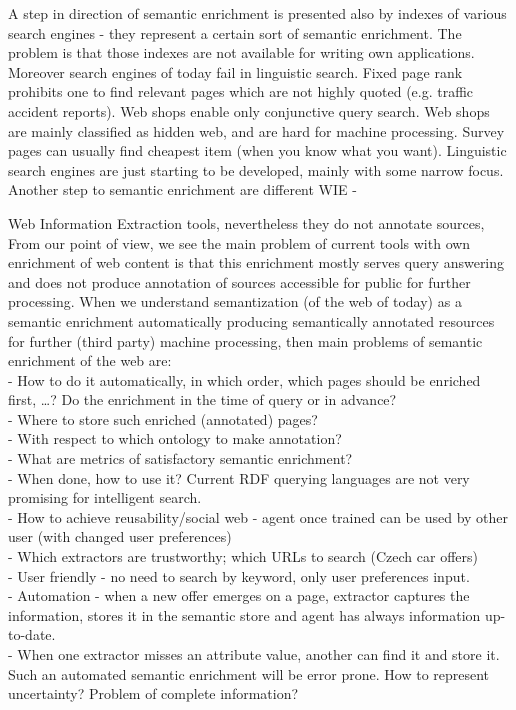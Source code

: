 \documentclass{sig-alternate}
\begin{document}
A step in direction of semantic enrichment is presented also by indexes of various search engines - they represent a certain sort of semantic enrichment. The problem is that those indexes are not available for writing own applications. Moreover search engines of today fail in linguistic search. Fixed page rank prohibits one to find relevant pages which are not highly quoted (e.g. traffic accident reports). Web shops enable only conjunctive query search. Web shops are mainly classified as hidden web, and are hard for machine processing. Survey pages can usually find cheapest item (when you know what you want). Linguistic search engines are just starting to be developed, mainly with some narrow focus. Another step to semantic enrichment are different WIE - 

Web Information Extraction tools, nevertheless they do not annotate sources, From our point of view, we see the main problem of current tools with own enrichment of web content is that this enrichment mostly serves query answering and does not produce annotation of sources accessible for public for further processing.
When we understand semantization (of the web of today) as a semantic enrichment automatically producing semantically annotated resources for further (third party) machine processing, then main problems of semantic enrichment of the web are:
\\- How to do it automatically, in which order, which pages should be enriched first, \dots? Do the enrichment in the time of query or in advance?
\\- Where to store such enriched (annotated) pages?
\\- With respect to which ontology to make annotation?
\\- What are metrics of satisfactory semantic enrichment?
\\- When done, how to use it? Current RDF querying languages are not very promising for intelligent search.
\\- How to achieve reusability/social web - agent once trained can be used by other user (with changed user preferences)
\\- Which extractors are trustworthy; which URLs to search (Czech car offers)
\\- User friendly - no need to search by keyword, only user preferences input.
\\- Automation - when a new offer emerges on a page, extractor captures the information, stores it in the semantic store and agent has always information up-to-date.
\\- When one extractor misses an attribute value, another can find it and store it. Such an automated semantic enrichment will be error prone. How to represent uncertainty? Problem of complete information?
\end{document}
